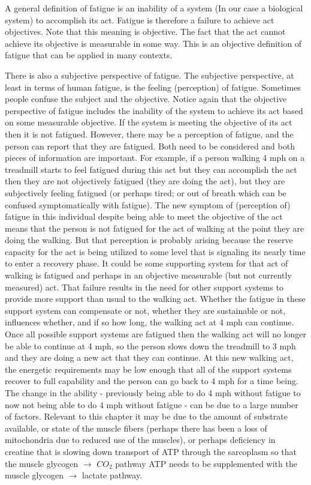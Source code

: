A general definition of fatigue is an inability of a system (In our case a biological system) to accomplish its act. Fatigue is therefore a failure to achieve act objectives. Note that this meaning is objective. The fact that the act cannot achieve its objective is measurable in some way. This is an objective definition of fatigue that can be applied in many contexts.

There is also a subjective perspective of fatigue. The subjective perspective, at least in terms of human fatigue, is the feeling (perception) of fatigue. Sometimes people confuse the subject and the objective. Notice again that the objective perspective of fatigue includes the inability of the system to achieve its act based on some measurable objective. If the system is meeting the objective of its act then it is not fatigued. However, there may be a perception of fatigue, and the person can report that they are fatigued. Both need to be considered and both pieces of information are important. For example, if a person walking 4 mph on a treadmill starts to feel fatigued during this act but they can accomplish the act then they are not objectively fatigued (they are doing the act), but they are subjectively feeling fatigued (or perhaps tired; or out of breath which can be confused symptomatically with fatigue). The new symptom of (perception of) fatigue in this individual despite being able to meet the objective of the act means that the person is not fatigued for the act of walking at the point they are doing the walking. But that perception is probably arising because the reserve capacity for the act is being utilized to some level that is signaling its nearly time to enter a recovery phase. It could be some supporting system for that act of walking is fatigued and perhaps in an objective measurable (but not currently measured) act. That failure results in the need for other support systems to provide more support than usual to the walking act. Whether the fatigue in these support system can compensate or not, whether they are sustainable or not, influences whether, and if so how long, the walking act at 4 mph can continue. Once all possible support systems are fatigued then the walking act will no longer be able to continue at 4 mph, so the person slows down the treadmill to 3 mph and they are doing a new act that they can continue. At this new walking act, the energetic requirements may be low enough that all of the support systems recover to full capability and the person can go back to 4 mph for a time being. The change in the ability - previously being able to do 4 mph without fatigue to now not being able to do 4 mph without fatigue - can be due to a large number of factors. Relevant to this chapter it may be due to the amount of substrate available, or state of the muscle fibers (perhaps there has been a loss of mitochondria due to reduced use of the muscles), or perhaps deficiency in creatine that is slowing down transport of ATP through the sarcoplasm so that the muscle glycogen $\rightarrow$ $CO_2$ pathway ATP needs to be supplemented with the muscle glycogen $\rightarrow$ lactate pathway.


